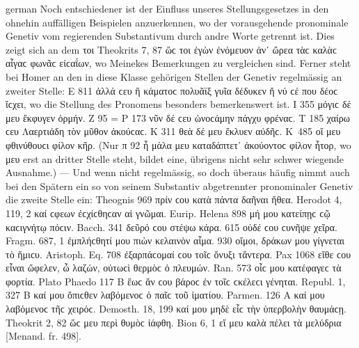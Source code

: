\begin{otherlanguage*}{german}
Noch entschiedener ist der Einfluss unseres Stellungsgesetzes in den ohnehin auffälligen Beispielen anzuerkennen, wo der vorausgehende pronominale Genetiv vom regierenden Substantivum durch andre Worte getrennt ist. Dies zeigt sich an dem τοι Theokrits 7, 87 ὥϲ τοι ἐγὼν ἐνόμευον ἀν᾽ ὤρεα τὰϲ καλὰϲ αἶγαϲ φωνᾶϲ εἰϲαΐων, wo Meinekes Bemerkungen zu vergleichen sind. Ferner steht bei Homer an den in diese Klasse gehörigen Stellen der Genetiv regelmässig an zweiter Stelle: Ε 811 ἀλλά ϲευ ἢ κάματοϲ πολυᾶϊξ γυῖα δέδυκεν ἤ νύ ϲέ που δέοϲ ἴϲχει, wo die Stellung des Pronomens besonders bemerkenswert ist. Ι 355 μόγιϲ δέ μευ ἔκφυγεν ὁρμήν. Ζ 95 = Ρ 173 νῦν δέ ϲευ ὠνοϲάμην πάγχυ φρέναϲ. Τ 185 χαίρω ϲευ Λαερτιάδη τὸν μῦθον ἀκούϲαϲ. Κ 311 θεὰ δέ μευ ἔκλυεν αὐδῆϲ. Κ~485 οἵ μευ φθινύθουϲι φίλον κῆρ. (Nur π 92 ἦ μάλα μευ καταδάπτετ᾽ ἀκούοντοϲ φίλον ἦτορ, wo μευ erst an dritter Stelle steht, bildet eine, übrigens nicht sehr schwer wiegende Ausnahme.) — Und wenn nicht regelmässig, so doch überaus häufig nimmt auch bei den Spätern ein so von seinem Substantiv abgetrennter pronominaler Genetiv die zweite Stelle ein: Theognis 969 πρίν ϲου κατὰ πάντα δαῆναι ἤθεα. Herodot 4, 119, 2 καί ϲφεων ἐϲχίϲθηϲαν αἱ γνῶμαι. Eurip. Helena 898 μή μου κατείπῃϲ ϲῷ καϲιγνήτῳ πόϲιν. Bacch. 341 δεῦρό ϲου στέψω κάρα. 615 οὐδέ ϲου ϲυνῆψε χεῖρα. Fragm. 687, 1 ἐμπλήϲθητί μου πιὼν κελαινὸν αἷμα. 930 οἴμοι, δράκων μου γίγνεται τὸ ἥμιϲυ. Aristoph. Eq. 708 ἐξαρπάϲομαί ϲου τοῖϲ ὄνυξι τἄντερα. Pax 1068 εἴθε ϲου εἶναι ὤφελεν, ὦ λαζών, οὑτωϲὶ θερμὸϲ ὁ πλευμών. Ran. 573 οἷϲ μου κατέφαγεϲ τὰ φορτία. Plato Phaedo 117 Β ἕωϲ ἄν ϲου βάροϲ ἐν τοῖϲ ϲκέλεϲι γένηται. Republ. 1, 327 B καί μου ὄπιϲθεν λαβόμενοϲ ὁ παῖϲ τοῦ ἱματίου. Parmen. 126 Α καί μου λαβόμενοϲ τῆϲ χειρόϲ. Demosth. 18, 199 καί μου μηδὲ εἷϲ τὴν ὑπερβολὴν θαυμάϲῃ. Theokrit 2, 82 ὥϲ μευ περὶ θυμὸϲ ἰάφθη. Bion 6, 1 εἴ μευ καλὰ πέλει τὰ μελύδρια [Menand. fr. 498].


\end{otherlanguage*}
